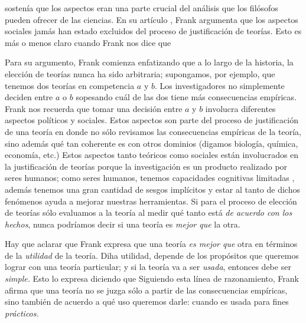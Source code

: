  sostenía que los aspectos  eran una parte crucial del análisis que los filósofos pueden ofrecer de las ciencias.
En su artículo , Frank argumenta que los aspectos sociales jamás han estado excluidos del proceso de justificación de teorías.
Esto es más o menos claro cuando Frank nos dice que  \parencite[p.~143]{Frank1954}

Para su argumento, Frank comienza enfatizando que a lo largo de la historia, la elección de teorías nunca ha sido arbitraria;
supongamos, por ejemplo, que tenemos dos teorías en competencia $a$ y $b$.
Los investigadores no simplemente deciden entre $a$ o $b$ sopesando cuál de las dos tiene más consecuencias empíricas.
Frank nos recuerda que tomar una decisión entre $a$ y $b$ involucra diferentes aspectos políticos y sociales.
Estos aspectos son parte del proceso de justificación de una teoría en donde no sólo revisamos las consecuencias empíricas de la teoría, sino además qué tan coherente es con otros dominios (digamos biología, química, economía, etc.)
Estos aspectos tanto teóricos como sociales están involucrados en la justificación de teorías porque la investigación es un producto realizado por seres humanos;
como seres humanos, tenemos capacidades cognitivas limitadas \parencite{Potochnik2017-POTIAT-3}, además tenemos una gran cantidad de sesgos implícitos \parencite{nordell2021end} y estar al tanto de dichos fenómenos ayuda a mejorar nuestras herramientas.
Si para el proceso de elección de teorías sólo evaluamos a la teoría al medir qué tanto está \emph{de acuerdo con los hechos}, nunca podríamos decir si una teoría es \emph{mejor que} la otra.

Hay que aclarar que Frank expresa que una teoría \emph{es mejor que} otra en términos de la \emph{utilidad} de la teoría.
Diha utilidad, depende de los propósitos que queremos lograr con una teoría particular;
y si la teoría va a ser \emph{usada}, entonces debe ser \emph{simple.}
Esto lo expresa diciendo que  
Siguiendo esta línea de razonamiento, Frank afirma que una teoría no se juzga sólo a partir de las consecuencias empíricas, sino también de acuerdo a qué uso queremos darle: cuando es usada para fines \emph{prácticos.}

